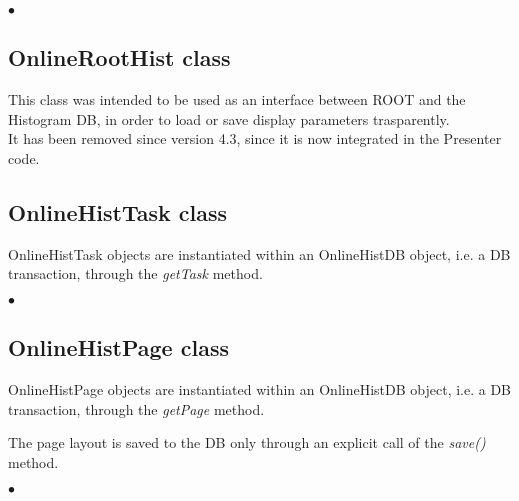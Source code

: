 \documentclass{lhcbnote}
\begin{document}
\begin{list}{$\bullet$}{}

\end{list}

\subsection{OnlineRootHist class}


This class was intended to be used as an interface between ROOT and the
Histogram DB, in
order to load or save display parameters trasparently. \\
It has been removed since version 4.3, since it is now integrated in
the Presenter code.





%


\subsection{OnlineHistTask class}

OnlineHistTask objects are instantiated within an
OnlineHistDB object, i.e. a DB transaction, through the {\it getTask} method.

\begin{list}{$\bullet$}{}

\end{list}


\subsection{OnlineHistPage class}

OnlineHistPage objects are instantiated within an
OnlineHistDB object, i.e. a DB transaction, through the {\it
getPage} method.

The page layout is saved to the DB only through an explicit call of
the {\it save()} method.

\begin{list}{$\bullet$}{}

\end{list}
\end{document}

